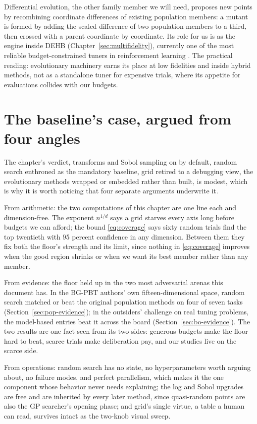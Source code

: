 Differential evolution, the other family member we will need, proposes new
points by recombining coordinate differences of existing population members:
a mutant is formed by adding the scaled difference of two population members
to a third, then crossed with a parent coordinate by coordinate. Its role
for us is as the engine inside DEHB (Chapter~\ref{sec:multifidelity}),
currently one of the most reliable budget-constrained tuners in
reinforcement learning \citep{eimer2023hyperparameters}. The practical
reading: evolutionary machinery earns its place at low fidelities and inside
hybrid methods, not as a standalone tuner for expensive trials, where its
appetite for evaluations collides with our budgets.

\section{The baseline's case, argued from four angles}
\label{sec:mf0-angles}

The chapter's verdict, transforms and Sobol sampling on by default,
random search enthroned as the mandatory baseline, grid retired to a
debugging view, the evolutionary methods wrapped or embedded rather
than built, is modest, which is why it is worth noticing that four
separate arguments underwrite it.

From arithmetic: the two computations of this chapter are one line
each and dimension-free. The exponent $n^{1/d}$ says a grid starves
every axis long before budgets we can afford; the bound
\eqref{eq:coverage} says sixty random trials find the top twentieth
with 95 percent confidence in any dimension. Between them they fix
both the floor's strength and its limit, since nothing in
\eqref{eq:coverage} improves when the good region shrinks or when we
want its best member rather than any member.

From evidence: the floor held up in the two most adversarial arenas
this document has. In the BG-PBT authors' own fifteen-dimensional
space, random search matched or beat the original population methods
on four of seven tasks (Section~\ref{sec:pop-evidence}); in the
outsiders' challenge on real tuning problems, the model-based entries
beat it across the board (Section~\ref{sec:bo-evidence}). The two
results are one fact seen from its two sides: generous budgets make
the floor hard to beat, scarce trials make deliberation pay, and our
studies live on the scarce side.

From operations: random search has no state, no hyperparameters worth
arguing about, no failure modes, and perfect parallelism, which makes
it the one component whose behavior never needs explaining; the log
and Sobol upgrades are free and are inherited by every later method,
since quasi-random points are also the GP searcher's opening phase;
and grid's single virtue, a table a human can read, survives intact
as the two-knob visual sweep.

